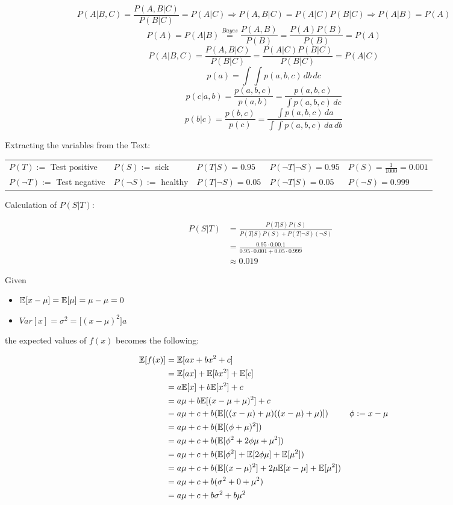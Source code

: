 %
\[P(A|B,C) = \frac{P(A,B|C)}{P(B|C)} = P(A|C) \Rightarrow P(A,B|C) = P(A|C)P(B|C) \Rightarrow P(A|B) = P(A)\]
%
%
\[ P(A) = P(A|B) \overset{Bayes}{=} \frac{P(A,B)}{P(B)} = \frac{P(A)P(B)}{P(B)} = P(A) \]
\[P(A|B,C) = \frac{P(A,B|C)}{P(B|C)} = \frac{P(A|C)P(B|C)}{P(B|C)} = P(A|C) \]
%
%
\[ p(a) = \int \int p(a,b,c)\,db\,dc \]
\[ p(c|a,b) = \frac{p(a,b,c)}{p(a,b)} = \frac{p(a,b,c)}{\int p(a,b,c)\, dc} \]
\[ p(b|c) = \frac{p(b,c)}{p(c)} = \frac{\int p(a,b,c) \, da}{\int \int p(a,b,c)\,da\,db} \]
%
%
\begin{flushleft}
Extracting the variables from the Text:
\end{flushleft}
\begin{table}[h]
\begin{tabular}{lllll}
  $P(T) :=$ Test positive & $P(S) :=$ sick & $P(T|S) = 0.95$ & $P(\neg T|\neg S) = 0.95$ & $P(S) = \frac{1}{1000} = 0.001$ \\
  $P(\neg T) :=$ Test negative & $P(\neg S) :=$ healthy & $P(T|\neg S) = 0.05$ & $P(\neg T|S) = 0.05$ & $P(\neg S) = 0.999$
\end{tabular}
\end{table}
\begin{flushleft}
Calculation of $P(S|T)$:
\end{flushleft}
\begin{align*}
  P(S|T) &= \frac{P(T|S)P(S)}{P(T|S)P(S) + P(T|\neg S)(\neg S)} &\\
  &= \frac{0.95 \cdot 0.00.1}{0.95 \cdot 0.001 + 0.05 \cdot 0.999} &\\
  &\approx 0.019 &
\end{align*}
%
%
\begin{flushleft}
Given
\begin{itemize}
  \item $\mathbb{E}[x-\mu] = \mathbb{E}[\mu] = \mu - \mu = 0$
  \item $Var[x] = \sigma^2 = \mathbb[(x-\mu)^2]a$
\end{itemize}
the expected values of $f(x)$ becomes the following:
\end{flushleft}
\begin{align}
  \mathbb{E}[f(x)] &= \mathbb{E}[ax + bx^2 + c] &\\
  &= \mathbb{E}[ax] + \mathbb{E}[bx^2] + \mathbb{E}[c] &\\
  &= a \mathbb{E}[x] + b \mathbb{E}[x^2] + c &\\
  &= a\mu + b \mathbb{E}[(x-\mu+\mu)^2] + c &\\
  &= a\mu + c + b(\mathbb{E}[((x-\mu) + \mu) ((x-\mu)+\mu)]) &\phi := x-\mu \\
  &= a\mu + c + b(\mathbb{E}[(\phi + \mu)^2]) \\
  &= a\mu + c + b(\mathbb{E}[\phi^2 + 2\phi\mu +\mu^2]) &\\
  &= a\mu + c + b(\mathbb{E}[\phi^2] + \mathbb{E}[2\phi\mu] + \mathbb{E}[\mu^2]) &\\
  &= a\mu + c + b(\mathbb{E}[(x-\mu)^2] + 2\mu \mathbb{E}[x-\mu] + \mathbb{E}[\mu^2]) &\\
  &= a\mu + c + b(\sigma^2 + 0 + \mu^2) &\\
  &= a\mu + c + b\sigma^2 + b\mu^2 &
\end{align}

